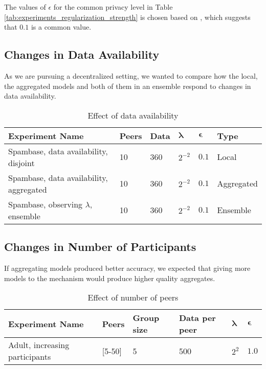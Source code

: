 The values of $\epsilon$ for the  common privacy level in Table \ref{tab:experiments_regularization_strength} is chosen based on \cite{dwork2008differential}, which suggests that $0.1$ is a common value.

\subsection{Changes in Data Availability}

As we are pursuing a decentralized setting, we wanted to compare how the local, the aggregated models and both of them in an ensemble respond to changes in data availability.

\begin{table}[h]
	\centering
	\caption{Effect of data availability}
	\label{tab:experiments_data_availability}
	\begin{tabular}{|l|l|l|l|l|l|}
		\textbf{Experiment Name}                                 & \textbf{Peers} & \textbf{Data} & $\boldsymbol{\lambda}$ & $\boldsymbol{\epsilon}$ & \textbf{Type}       \\
		\hline
		Spambase, data availability, disjoint         & 10    & 360  & $2^{-2}$  & $0.1$      & Local      \\
		Spambase, data availability, aggregated    & 10    & 360  & $2^{-2}$  & $0.1$      & Aggregated \\
		Spambase, observing $\lambda$, ensemble & 10    & 360  & $2^{-2}$  & $0.1$  & Ensemble  
	\end{tabular}
\end{table}

\subsection{Changes in Number of Participants}

If aggregating models produced better accuracy, we expected that giving more models to the mechanism would produce higher quality aggregates.

\begin{table}[h]
	\centering
	\label{tab:experiments_peer_numbers}
	\begin{tabular}{|l|l|l|l|l|l|}
		\textbf{Experiment Name}                & \textbf{Peers}      & \textbf{Group size} & \textbf{Data per peer} & $\boldsymbol{\lambda}$ & $\boldsymbol{\epsilon}$ \\
		\hline
		Adult, increasing participants & {[}5-50{]} & 5          & 500  & $2^{2}$   & $1.0$     
	\end{tabular}
	\caption{Effect of number of peers}
\end{table}


